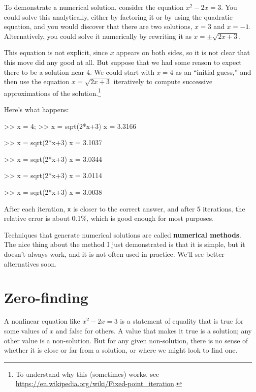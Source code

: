 \documentclass[
]{book}
\numberwithin{Answer}{chapter}
\numberwithin{Exercise}{chapter}
\begin{document}
To demonstrate a numerical solution, consider the equation $x^2 - 2x =
3$.  You could solve this analytically, either by factoring it or by
using the quadratic equation, and you would discover that there are
two solutions, $x=3$ and $x=-1$.  Alternatively, you could solve it
numerically by rewriting it as $x = \pm \sqrt{2x+3}$.

This equation is not explicit, since $x$ appears on both sides, so
it is not clear that this move did any good at all.  But suppose
that we had some reason to expect there to be a solution near 4.
We could start with $x=4$ as an ``initial guess,'' and then use
the equation $x = \sqrt{2x+3}$ iteratively to compute successive
approximations of the solution.\footnote{To understand why this
(sometimes) works, see \url{https://en.wikipedia.org/wiki/Fixed-point_iteration}.}


Here's what happens:

\begin{code}
>> x = 4;
>> x = sqrt(2*x+3)
x = 3.3166

>> x = sqrt(2*x+3)
x = 3.1037

>> x = sqrt(2*x+3)
x = 3.0344

>> x = sqrt(2*x+3)
x = 3.0114

>> x = sqrt(2*x+3)
x = 3.0038
\end{code}

After each iteration, {\tt x} is closer to the correct answer,
and after 5 iterations, the relative error is about 0.1\%, which
is good enough for most purposes.


Techniques that generate numerical solutions are called
{\bf numerical methods}.  
The nice thing about the method I
just demonstrated is that it is simple, but it doesn't always
work, and it is not often used in practice.
We'll see better alternatives soon.



\section{Zero-finding}
\label{sect:zero}

A nonlinear equation like $x^2 - 2x = 3$ is a statement of
equality that is true for some values of $x$ and false for
others.  A value that makes it true is a solution;
any other value is a non-solution.  But for any given non-solution,
there is no sense of whether it is close or far from a solution,
or where we might look to find one.
\end{document}
